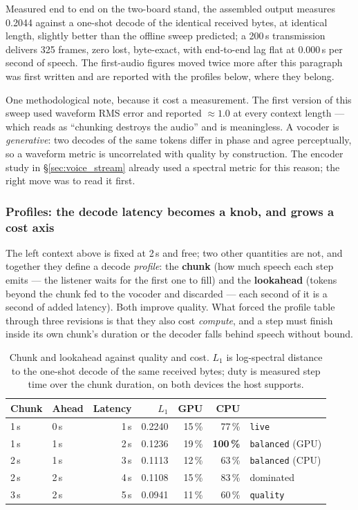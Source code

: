 Measured end to end on the two-board stand, the assembled output
measures 0.2044 against a one-shot decode of the identical received
bytes, at identical length, slightly better than the offline sweep
predicted; a 200\,s transmission delivers 325 frames, zero lost,
byte-exact, with end-to-end lag flat at 0.000\,s per second of
speech.  The first-audio figures moved twice more after this
paragraph was first written and are reported with the profiles below,
where they belong.

One methodological note, because it cost a measurement.  The first
version of this sweep used waveform RMS error and reported $\approx
1.0$ at every context length --- which reads as ``chunking destroys the
audio'' and is meaningless.  A vocoder is \emph{generative}: two
decodes of the same tokens differ in phase and agree perceptually, so a
waveform metric is uncorrelated with quality by construction.  The
encoder study in \S\ref{sec:voice_stream} already used a spectral
metric for this reason; the right move was to read it first.

\subsubsection{Profiles: the decode latency becomes a knob, and grows a cost axis}
The left context above is fixed at 2\,s and free; two other quantities
are not, and together they define a decode \emph{profile}: the
\textbf{chunk} (how much speech each step emits --- the listener waits
for the first one to fill) and the \textbf{lookahead} (tokens beyond
the chunk fed to the vocoder and discarded --- each second of it is a
second of added latency).  Both improve quality.  What forced the
profile table through three revisions is that they also cost
\emph{compute}, and a step must finish inside its own chunk's duration
or the decoder falls behind speech without bound.

\begin{table}[H]
    \centering
    \caption{Chunk and lookahead against quality and cost.  $L_1$ is
             log-spectral distance to the one-shot decode of the same
             received bytes; duty is measured step time over the chunk
             duration, on both devices the host supports.}
    \label{tab:voice_profiles}
    \small
    \begin{tabular}{@{}llrrrrl@{}}
    \toprule
    \textbf{Chunk} & \textbf{Ahead} & \textbf{Latency} &
    \textbf{$L_1$} & \textbf{GPU} & \textbf{CPU} & \\
    \midrule
    1\,s & 0\,s & 1\,s & 0.2240 & 15\,\% &  77\,\% & \texttt{live} \\
    1\,s & 1\,s & 2\,s & 0.1236 & 19\,\% & \textbf{100\,\%} &
        \texttt{balanced} (GPU) \\
    2\,s & 1\,s & 3\,s & 0.1113 & 12\,\% &  63\,\% &
        \texttt{balanced} (CPU) \\
    2\,s & 2\,s & 4\,s & 0.1108 & 15\,\% &  83\,\% & dominated \\
    3\,s & 2\,s & 5\,s & 0.0941 & 11\,\% &  60\,\% & \texttt{quality} \\
    \bottomrule
    \end{tabular}
\end{table}


